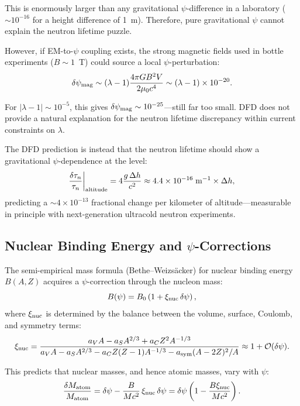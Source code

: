 \documentclass[aps,prb,twocolumn,superscriptaddress,floatfix,nofootinbib,longbibliography]{revtex4-2}
\newcommand{\order}[1]{\mathcal{O}(#1)}
\begin{document}
This is enormously larger than any gravitational $\psi$-difference in a
laboratory ($\sim 10^{-16}$ for a height difference of 1~m).  Therefore,
pure gravitational $\psi$ cannot explain the neutron lifetime puzzle.

However, if EM-to-$\psi$ coupling exists, the strong magnetic fields
used in bottle experiments ($B \sim 1$~T) could source a local
$\psi$-perturbation:
\begin{equation}
\delta\psi_{\rm mag} \sim (\lambda - 1)\frac{4\pi G B^2 V}{2\mu_0 c^4}
\sim (\lambda - 1) \times 10^{-20}.
\label{eq:psi-mag-bottle}
\end{equation}

For $|\lambda - 1| \sim 10^{-5}$, this gives
$\delta\psi_{\rm mag} \sim 10^{-25}$---still far too small.  DFD does
not provide a natural explanation for the neutron lifetime discrepancy
within current constraints on $\lambda$.

The DFD prediction is instead that the neutron lifetime should show a
gravitational $\psi$-dependence at the level:
\begin{equation}
\frac{\delta\tau_n}{\tau_n}\bigg|_{\rm altitude}
= 4\frac{g\,\Delta h}{c^2} \approx 4.4 \times 10^{-16}\;\text{m}^{-1}\times\Delta h,
\label{eq:neutron-altitude}
\end{equation}
predicting a $\sim 4 \times 10^{-13}$ fractional change per kilometer
of altitude---measurable in principle with next-generation ultracold
neutron experiments.

\subsection{Nuclear Binding Energy and $\psi$-Corrections}

The semi-empirical mass formula (Bethe--Weizs\"acker) for nuclear binding
energy $B(A,Z)$ acquires a $\psi$-correction through the nucleon mass:
\begin{equation}
B(\psi) = B_0\left(1 + \xi_{\rm nuc}\,\delta\psi\right),
\label{eq:binding-psi}
\end{equation}
where $\xi_{\rm nuc}$ is determined by the balance between the volume,
surface, Coulomb, and symmetry terms:
\begin{equation}
\xi_{\rm nuc} = \frac{a_V A - a_S A^{2/3} + a_C Z^2 A^{-1/3}}
{a_V A - a_S A^{2/3} - a_C Z(Z-1)A^{-1/3} - a_{\rm sym}(A-2Z)^2/A}
\approx 1 + \order{\delta\psi}.
\label{eq:xi-nuc}
\end{equation}

This predicts that nuclear masses, and hence atomic masses, vary with
$\psi$:
\begin{equation}
\frac{\delta M_{\rm atom}}{M_{\rm atom}} = \delta\psi
- \frac{B}{Mc^2}\,\xi_{\rm nuc}\,\delta\psi
= \delta\psi\left(1 - \frac{B\xi_{\rm nuc}}{Mc^2}\right).
\label{eq:mass-psi-atom}
\end{equation}
\end{document}
